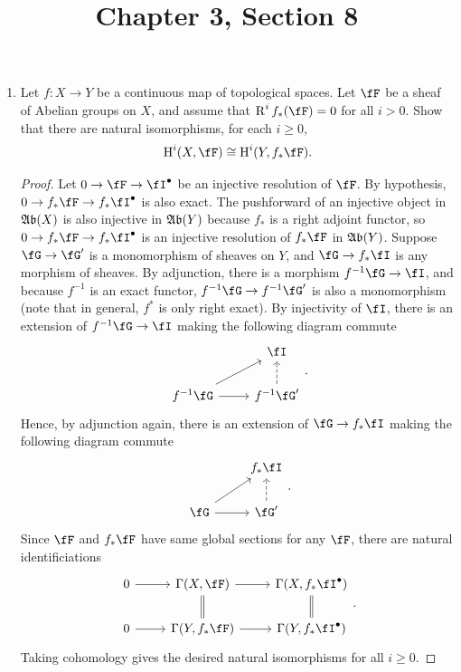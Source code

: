\documentclass[a4paper]{article}
\title{Chapter 3, Section 8}
\begin{document}
\maketitle

\begin{enumerate} [label=\textbf{\arabic*.}, leftmargin=0em]

  \item Let $f : X \to Y$ be a continuous map of topological spaces.
        Let $\fF$ be a sheaf of Abelian groups on $X$, and assume that $\dR^if_*(\fF) = 0$ for all $i > 0$.
        Show that there are natural isomorphisms, for each $i \geq 0$,
        \begin{equation*}
          \cH^i(X, \fF) \cong \cH^i(Y, f_* \fF).
        \end{equation*}

        \begin{proof}
          Let $0 \to \fF \to \fI^\bullet$ be an injective resolution of $\fF$.
          By hypothesis, $0 \to f_* \fF \to f_* \fI^\bullet$ is also exact.
          The pushforward of an injective object in $\mathfrak{Ab}(X)$ is also injective in $\mathfrak{Ab}(Y)$ because $f_*$ is a right adjoint functor, so $0 \to f_*\fF \to f_* \fI^\bullet$ is an injective resolution of $f_* \fF$ in $\mathfrak{Ab}(Y)$.
          Suppose $\fG \to \fG'$ is a monomorphism of sheaves on $Y$, and $\fG \to f_*\fI$ is any morphism of sheaves.
          By adjunction, there is a morphism $f^{-1} \fG \to \fI$, and because $f^{-1}$ is an exact functor, $f^{-1} \fG \to f^{-1} \fG'$ is also a monomorphism (note that in general, $f^*$ is only right exact).
          By injectivity of $\fI$, there is an extension of $f^{-1} \fG \to \fI$ making the following diagram commute
          \[ \begin{tikzcd}
              & \fI                           \\
              f^{-1} \fG \arrow[r] \arrow[ru] & f^{-1} \fG' \arrow[u, dashed]
            \end{tikzcd}. \]
          Hence, by adjunction again, there is an extension of $\fG \to f_* \fI$ making the following diagram commute
          \[ \begin{tikzcd}
              & f_*\fI                           \\
              \fG \arrow[r] \arrow[ru] & \fG' \arrow[u, dashed]
            \end{tikzcd}. \]
          Since $\fF$ and $f_*\fF$ have same global sections for any $\fF$, there are natural identificiations
          \[ \begin{tikzcd}
              0 \arrow[r] & {\Gamma(X, \fF)} \arrow[r] \arrow[d, Rightarrow, no head] & {\Gamma(X, f_* \fI^\bullet)} \arrow[d, Rightarrow, no head] \\
              0 \arrow[r] & {\Gamma(Y, f_* \fF)} \arrow[r]                            & {\Gamma(Y, f_*\fI^\bullet)}
            \end{tikzcd}. \]
          Taking cohomology gives the desired natural isomorphisms for all $i \geq 0$.
        \end{proof}


\end{enumerate}
\end{document}
